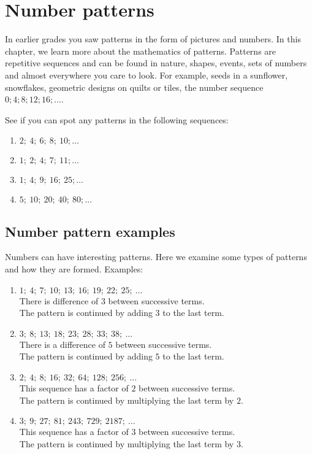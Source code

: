          \chapter{Number patterns}
    \setcounter{figure}{1}
    \setcounter{subfigure}{1}
            
In earlier grades you saw patterns in the form of pictures and numbers. In this chapter, we learn more about the mathematics of patterns. Patterns are repetitive sequences and can be found in nature, shapes, events, sets of numbers and almost everywhere you care to look. For example, seeds in a sunflower, snowflakes, geometric designs on quilts or tiles, the number sequence $0;4;8;12;16;\ldots$.\par 
See if you can spot any patterns in the following sequences: 
\begin{enumerate}[noitemsep, label=\textbf{\arabic*}. ] 
    \item $2;~4;~6;~8;~10;\ldots$
    \item $1;~2;~4;~7;~11;\ldots$
    \item $1;~4;~9;~16;~25;\ldots$
    \item $5;~10;~20;~40;~80;\ldots$
\end{enumerate}
\section{Number pattern examples}
Numbers can have interesting patterns. Here we examine some types of patterns and how they are formed.
Examples:
\begin{enumerate}[noitemsep, label=\textbf{\arabic*}. ] 
    \item $1;~4;~7;~10;~13;~16;~19;~22;~25;~\ldots$\\
    There is difference of $3$ between successive terms.\\
    The pattern is continued by adding $3$ to the last term.
    \item $3;~8;~13;~18;~23;~28;~33;~38;~\ldots$\\
    There is a difference of $5$ between successive terms.\\
    The pattern is continued by adding $5$ to the last term.
    \item $2;~4;~8;~16;~32;~64;~128;~256;~\ldots$\\
    This sequence has a factor of $2$ between successive terms.\\
    The pattern is continued by multiplying the last term by $2$.
    \item $3;~9;~27;~81;~243;~729;~2187;~\ldots$\\
    This sequence has a factor of $3$ between successive terms.\\
    The pattern is continued by multiplying the last term by $3$.
\end{enumerate}
     

